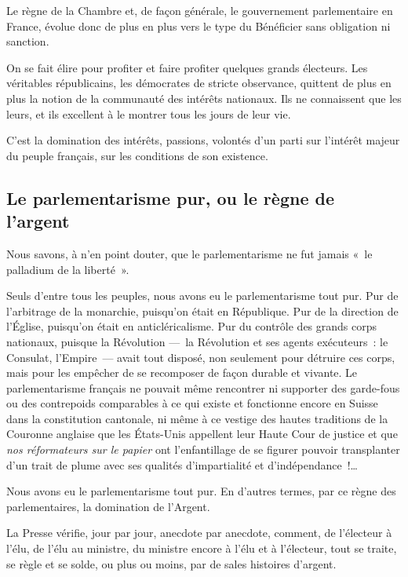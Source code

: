 \documentclass[french,twoside]{book} %
\newcommand{\astermono}{\medskip\centerline{\color{rubric}\large\selectfont{\syms ✻}}\medskip\par}%
\begin{document}
Le règne de la Chambre et, de façon générale, le gouvernement parlementaire en France, évolue donc de plus en plus vers le type du Bénéficier sans obligation ni sanction.\par
On se fait élire pour profiter et faire profiter quelques grands électeurs. Les véritables républicains, les démocrates de stricte observance, quittent de plus en plus la notion de la communauté des intérêts nationaux. Ils ne connaissent que les leurs, et ils excellent à le montrer tous les jours de leur vie.\par
C’est la domination des intérêts, passions, volontés d’un parti sur l’intérêt majeur du peuple français, sur les conditions de son existence.\par

\astermono

\subsection[Le parlementarisme pur, ou le règne de l’argent]{Le parlementarisme pur, ou le règne de l’argent}
\noindent Nous savons, à n’en point douter, que le parlementarisme ne fut jamais « le palladium de la liberté ».\par
Seuls d’entre tous les peuples, nous avons eu le parlementarisme tout pur. Pur de l’arbitrage de la monarchie, puisqu’on était en République. Pur de la direction de l’Église, puisqu’on était en anticléricalisme. Pur du contrôle des grands corps nationaux, puisque la Révolution — la Révolution et ses agents exécuteurs : le Consulat, l’Empire — avait tout disposé, non seulement pour détruire ces corps, mais pour les empêcher de se recomposer de façon durable et vivante. Le parlementarisme français ne pouvait même rencontrer ni supporter des garde-fous ou des contrepoids comparables à ce qui existe et fonctionne encore en Suisse dans la constitution cantonale, ni même à ce vestige des hautes traditions de la Couronne anglaise que les États-Unis appellent leur Haute Cour de justice et que \emph{nos réformateurs sur le papier} ont l’enfantillage de se figurer pouvoir transplanter d’un trait de plume avec ses qualités d’impartialité et d’indépendance !…\par
Nous avons eu le parlementarisme tout pur. En d’autres termes, par ce règne des parlementaires, la domination de l’Argent.\par
La Presse vérifie, jour par jour, anecdote par anecdote, comment, de l’électeur à l’élu, de l’élu au ministre, du ministre encore à l’élu et à l’électeur, tout se traite, se règle et se solde, ou plus ou moins, par de sales histoires d’argent.\par
\end{document}
